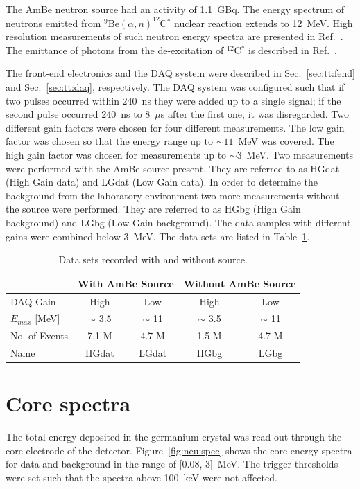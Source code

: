 The AmBe neutron source had an activity of 1.1~GBq. The energy spectrum of neutrons emitted from $^{9}$Be$(\alpha,n)^{12}$C$^{*}$ nuclear reaction extends to 12~MeV. High resolution measurements of such neutron energy spectra are presented in Ref.~\cite{Mar95, Gei75}. The emittance of photons from the de-excitation of $^{12}$C$^{*}$ is described in Ref.~\cite{Gei75}.

The front-end electronics and the DAQ system were described in Sec.~\ref{sec:tt:fend} and Sec.~\ref{sec:tt:daq}, respectively. The DAQ system was configured such that if two pulses occurred within 240~ns they were added up to a single signal; if the second pulse occurred 240~ns to 8~$\mu$s after the first one, it was disregarded. Two different gain factors were chosen for four different measurements. The low gain factor was chosen so that the energy range up to $\sim 11$~MeV was covered. The high gain factor was chosen for measurements up to $\sim 3$~MeV. Two measurements were performed with the AmBe source present. They are referred to as HGdat (High Gain data) and LGdat (Low Gain data). In order to determine the background from the laboratory environment two more measurements without the source were performed. They are referred to as HGbg (High Gain background) and LGbg (Low Gain background). The data samples with different gains were combined below 3~MeV. The data sets are listed in Table~\ref{tab:neu:datset}.

\begin{table}[tbhp]
\centering
\caption{Data sets recorded with and without source.} 
\label{tab:neu:datset}
\begin{tabular}{lcccc}\hline
& \multicolumn{2}{c}{With AmBe Source} & \multicolumn{2}{c}{Without AmBe Source} \\\hline
DAQ Gain & High  & Low   & High  & Low  \\
$E_{max}$ [MeV] & $\sim$ 3.5  & $\sim$ 11 & $\sim$ 3.5 & $\sim$ 11 \\
No. of Events & 7.1 M & 4.7 M & 1.5 M & 4.7 M \\
Name & HGdat & LGdat & HGbg & LGbg \\\hline
\end{tabular}
\end{table}

\section{Core spectra}
\label{sec:neu:spec}
The total energy deposited in the germanium crystal was read out through the core electrode of the detector. Figure~\ref{fig:neu:spec} shows the core energy spectra for data and background in the range of [0.08, 3]~MeV. The trigger thresholds were set such that the spectra above 100~keV were not affected.


